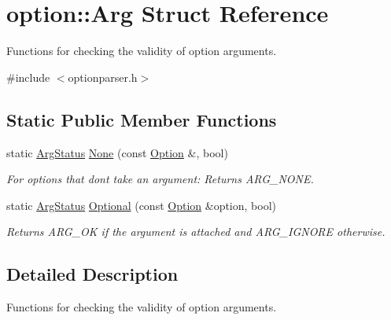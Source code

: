 \hypertarget{structoption_1_1_arg}{}\section{option\+:\+:Arg Struct Reference}
\label{structoption_1_1_arg}


Functions for checking the validity of option arguments.  




{\ttfamily \#include $<$optionparser.\+h$>$}

\subsection*{Static Public Member Functions}
\begin{DoxyCompactItemize}
\item 
\mbox{\label{structoption_1_1_arg_a7fc01987899c91c6b6a1be5711a46e22}} 
static \hyperlink{namespaceoption_aee8c76a07877335762631491e7a5a1a9}{Arg\+Status} \hyperlink{structoption_1_1_arg_a7fc01987899c91c6b6a1be5711a46e22}{None} (const \hyperlink{classoption_1_1_option}{Option} \&, bool)
\begin{DoxyCompactList}\small\item\em For options that don\textquotesingle{}t take an argument\+: Returns A\+R\+G\+\_\+\+N\+O\+NE. \end{DoxyCompactList}\item 
\mbox{\label{structoption_1_1_arg_aadb5316ecbc9eb0a7f0019d14bf35ad0}} 
static \hyperlink{namespaceoption_aee8c76a07877335762631491e7a5a1a9}{Arg\+Status} \hyperlink{structoption_1_1_arg_aadb5316ecbc9eb0a7f0019d14bf35ad0}{Optional} (const \hyperlink{classoption_1_1_option}{Option} \&option, bool)
\begin{DoxyCompactList}\small\item\em Returns A\+R\+G\+\_\+\+OK if the argument is attached and A\+R\+G\+\_\+\+I\+G\+N\+O\+RE otherwise. \end{DoxyCompactList}\end{DoxyCompactItemize}


\subsection{Detailed Description}
Functions for checking the validity of option arguments. 

